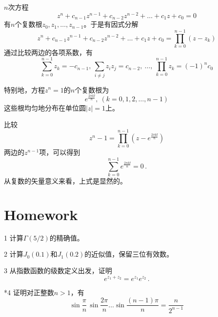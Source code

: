 \documentclass[CJK]{beamer}
\begin{document}
\begin{frame}
\bch
$n$次方程
$$z^n + c_{n-1}z^{n-1} + c_{n-2}z^{n-2}+\ldots + c_1 z+c_0=0$$
有$n$个复数根$z_0, z_1, \ldots, z_{n-1}$。于是有因式分解
$$z^n + c_{n-1}z^{n-1} + c_{n-2}z^{n-2}+\ldots + c_1 z+c_0=\prod_{k=0}^{n-1}\left(z-z_k\right)$$
通过比较两边的各项系数，有
$$ \sum_{k=0}^{n-1}z_k = -c_{n-1},\  \sum_{i\ne j} z_iz_j = c_{n-2},\ \ldots,\ \prod_{k=0}^{n-1}z_k = (-1)^nc_0$$

\ech
\end{frame}


\begin{frame}
\bch
特别地，方程$z^n=1$的$n$个复数根为
$$e^{\frac{2\pi k \ii}{n}}, \ (k=0,1,2,\ldots,n-1)$$
这些根均匀地分布在单位圆$|z|=1$上。

比较
$$z^n-1 = \prod_{k=0}^{n-1}\left(z-e^{\frac{2\pi k \ii}{n}}\right)$$
两边的$z^{n-1}$项，可以得到
$$\sum_{k=0}^{n-1} e^{\frac{2\pi k \ii}{n}} = 0\, .$$
从复数的矢量意义来看，上式是显然的。
\ech
\end{frame}



\section{Homework}

\begin{frame}
\bch
\bitem
\item[1]{计算$\Gamma(5/2)$的精确值。}
\item[2]{计算$J_0(0.1)$和$J_1(0.2)$的近似值，保留三位有效数。}
\item[3]{从指数函数的级数定义出发，证明$$ e^{z_1+z_2}= e^{z_1}e^{z_2}\, .$$}
\item[*4]{证明对正整数$n>1$，有
  $$\sin{\frac{\pi}{n}} \,  \sin{\frac{2\pi}{n}} \ldots  \sin{\frac{(n-1)\pi}{n}} = \frac{n}{2^{n-1}}$$
}
  
\eitem
\ech
\end{frame}
\end{document}
